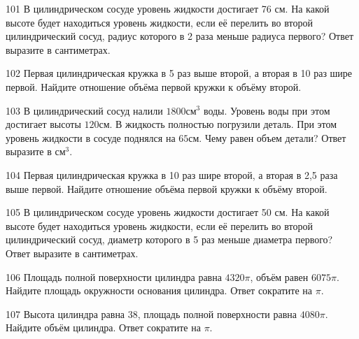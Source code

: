 \documentclass[4apaper]{article}
\begin{document}
\begin{taskBN}{101}
В цилиндрическом сосуде уровень жидкости достигает 76 см. На какой высоте будет находиться уровень жидкости, если её перелить во второй цилиндрический сосуд, радиус которого в 2 раза меньше радиуса первого? Ответ выразите в сантиметрах.
\end{taskBN}

\begin{taskBN}{102}
 Первая цилиндрическая кружка в 5 раз выше второй, а вторая в 10 раз шире первой. Найдите отношение объёма первой кружки к объёму второй.
\end{taskBN}

\begin{taskBN}{103}
В цилиндрический сосуд налили $1800\mbox{см}^3$ воды. Уровень воды при этом достигает высоты $120$см. В жидкость полностью погрузили деталь. При этом уровень жидкости в сосуде поднялся на $65$см. Чему равен объем детали? Ответ выразите в $\mbox{см}^3$.
\end{taskBN}

\begin{taskBN}{104}
 Первая цилиндрическая кружка в 10 раз шире второй, а вторая в 2,5 раза выше первой. Найдите отношение объёма первой кружки к объёму второй.
\end{taskBN}

\begin{taskBN}{105}
В цилиндрическом сосуде уровень жидкости достигает 50 см. На какой высоте будет находиться уровень жидкости, если её перелить во второй цилиндрический сосуд, диаметр которого в 5 раз меньше диаметра первого? Ответ выразите в сантиметрах.
\end{taskBN}

\begin{taskBN}{106}
Площадь полной поверхности цилиндра равна $4320\pi$, объём равен $6075\pi$. Найдите площадь окружности основания цилиндра. Ответ сократите на $\pi$.
\end{taskBN}

\begin{taskBN}{107}
Высота цилиндра равна $38$, площадь полной поверхности равна $4080\pi$. Найдите объём цилиндра. Ответ сократите на $\pi$.
\end{taskBN}
\end{document}
